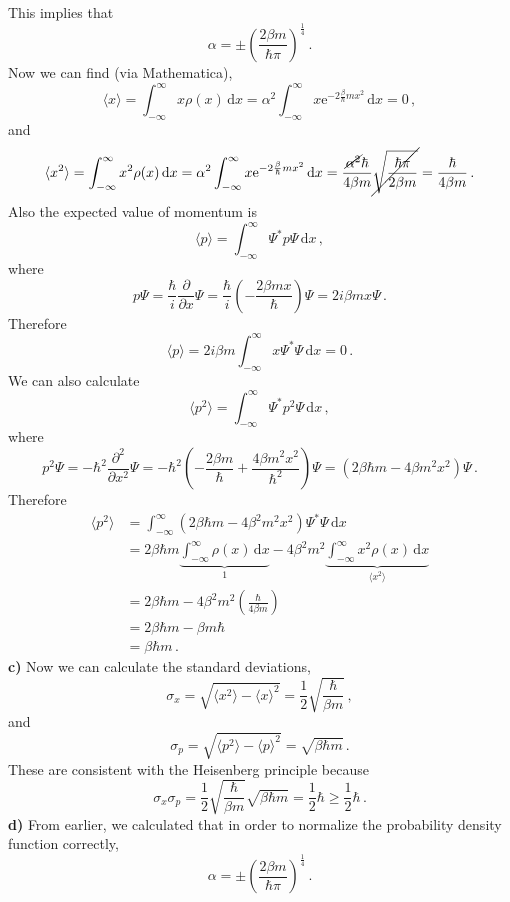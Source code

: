 \documentclass[letterpaper,10pt]{article}
\def\d{\mathrm{d}}
\def\e{\mathrm{e}}
\begin{document}
This implies that
\[
\alpha=\pm\left(\frac{2\beta m}{\hbar\pi}\right)^{\frac{1}{4}}\,.
\]
Now we can find (via Mathematica),
\[
\langle x\rangle=\int_{-\infty}^\infty x\rho(x)\,\d x
=\alpha^2\int_{-\infty}^\infty x\e^{-2\frac{\beta}{\hbar}m x^2}\,\d x=0\,,
\]
and
\[
\langle x^2\rangle=\int_{-\infty}^\infty x^2\rho(x)\,\d x
=\alpha^2\int_{-\infty}^\infty x\e^{-2\frac{\beta}{\hbar}m x^2}\,\d x
=\frac{\cancel{\alpha^2}\hbar}{4\beta m}\cancel{\sqrt{\frac{\hbar\pi}{2\beta
m}}}=\frac{\hbar}{4\beta m}\,.
\]
Also the expected value of momentum is
\[
\langle p\rangle=\int_{-\infty}^\infty\Psi^*p\Psi\,\d x\,,
\]
where
\[
p\Psi=\frac{\hbar}{i}\frac{\partial}{\partial x}\Psi
=\frac{\hbar}{i}\left(-\frac{2\beta m x}{\hbar}\right)\Psi
=2i\beta m x\Psi\,.
\]
Therefore
\[
\langle p\rangle=2i\beta m\int_{-\infty}^\infty x\Psi^*\Psi\,\d x=0\,.
\]
We can also calculate
\[
\langle p^2\rangle=\int_{-\infty}^\infty\Psi^*p^2\Psi\,\d x\,,
\]
where
\[
p^2\Psi=-\hbar^2\frac{\partial^2}{\partial x^2}\Psi
=-\hbar^2\left(-\frac{2\beta m}{\hbar}+\frac{4\beta m^2 x^2}{\hbar^2}\right)\Psi
=(2\beta\hbar m-4\beta m^2 x^2)\Psi\,.
\]
Therefore
\begin{align*}
\langle p^2\rangle&=\int_{-\infty}^\infty(2\beta\hbar m-4\beta^2 m^2 x^2)
\Psi^*\Psi\,\d x\\
&=2\beta\hbar m\underbrace{\int_{-\infty}^\infty\rho(x)\,\d x}_{1}
-4\beta^2 m^2\underbrace{\int_{-\infty}^\infty x^2\rho(x)\,\d x}_
{\langle x^2\rangle}\\
&=2\beta\hbar m-4\beta^2m^2\left(\frac{\hbar}{4\beta m}\right)\\
&=2\beta\hbar m-\beta m\hbar\\
&=\beta\hbar m\,.
\end{align*}
\textbf{c)} Now we can calculate the standard deviations,
\[
\sigma_x=\sqrt{\langle x^2\rangle-\langle x\rangle^2}
=\frac{1}{2}\sqrt{\frac{\hbar}{\beta m}}\,,
\]
and
\[
\sigma_p=\sqrt{\langle p^2\rangle-\langle p\rangle^2}
=\sqrt{\beta\hbar m}\,.
\]
These are consistent with the Heisenberg principle because
\[
\sigma_x\sigma_p=\frac{1}{2}\sqrt{\frac{\hbar}{\beta m}}\sqrt{\beta\hbar m}
=\frac{1}{2}\hbar\geq\frac{1}{2}\hbar\,.
\]
\textbf{d)} From earlier, we calculated that in order to normalize the
probability density function correctly,
\[
\alpha=\pm\left(\frac{2\beta m}{\hbar\pi}\right)^{\frac{1}{4}}\,.
\]
\end{document}
